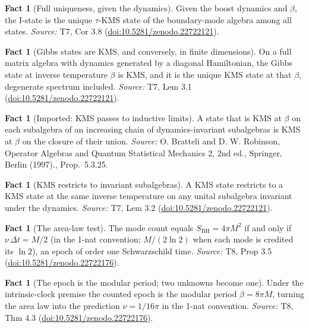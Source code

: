 \documentclass[11pt]{article}
\theoremstyle{definition}
\newtheorem{fact}[theorem]{Fact}
\theoremstyle{plain}
\providecommand{\SBH}{}\renewcommand{\SBH}{S_{\mathrm{BH}}}
\begin{document}
\begin{fact}[Full uniqueness, given the dynamics]\label{c:hawking.full-uniqueness-given-dynamics}
Given the boost dynamics and $\beta$, the I-state is the unique $\tau$-KMS state of the boundary-mode algebra among all states.
\emph{Source:} T7, Cor 3.8 (\href{https://doi.org/10.5281/zenodo.22722121}{doi:10.5281/zenodo.22722121}).
\end{fact}

\begin{fact}[Gibbs states are KMS, and conversely, in finite dimensions]\label{c:hawking.gibbs-states-are-kms-conversely-finite}
On a full matrix algebra with dynamics generated by a diagonal Hamiltonian, the Gibbs state at inverse temperature $\beta$ is KMS, and it is the unique KMS state at that $\beta$, degenerate spectrum included.
\emph{Source:} T7, Lem 3.1 (\href{https://doi.org/10.5281/zenodo.22722121}{doi:10.5281/zenodo.22722121}).
\end{fact}

\begin{fact}[Imported: KMS passes to inductive limits]\label{c:hawking.imported-kms-passes-inductive-limits}
A state that is KMS at $\beta$ on each subalgebra of an increasing chain of dynamics-invariant subalgebras is KMS at $\beta$ on the closure of their union.
\emph{Source:} O. Bratteli and D. W. Robinson, Operator Algebras and Quantum Statistical Mechanics 2, 2nd ed., Springer, Berlin (1997)., Prop.~5.3.25.
\end{fact}

\begin{fact}[KMS restricts to invariant subalgebras]\label{c:hawking.kms-restricts-invariant-subalgebras}
A KMS state restricts to a KMS state at the same inverse temperature on any unital subalgebra invariant under the dynamics.
\emph{Source:} T7, Lem 3.2 (\href{https://doi.org/10.5281/zenodo.22722121}{doi:10.5281/zenodo.22722121}).
\end{fact}

\begin{fact}[The area-law test]\label{c:scrambling.area-law-test}
The mode count equals $\SBH = 4\pi M^2$ if and only if $\nu\,\Delta t = M/2$ (in the 1-nat convention; $M/(2\ln 2)$ when each mode is credited its $\ln 2$), an epoch of order one Schwarzschild time.
\emph{Source:} T8, Prop 3.5 (\href{https://doi.org/10.5281/zenodo.22722176}{doi:10.5281/zenodo.22722176}).
\end{fact}

\begin{fact}[The epoch is the modular period; two unknowns become one]\label{c:scrambling.epoch-modular-period-two-unknowns-become}
Under the intrinsic-clock premise the counted epoch is the modular period $\beta = 8\pi M$, turning the area law into the prediction $\nu = 1/16\pi$ in the 1-nat convention.
\emph{Source:} T8, Thm 4.3 (\href{https://doi.org/10.5281/zenodo.22722176}{doi:10.5281/zenodo.22722176}).
\end{fact}
\end{document}
